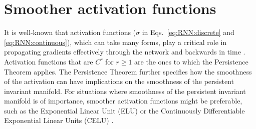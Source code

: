 \documentclass{article} %
\newcounter{ct}
\theoremstyle{definition}
\theoremstyle{remark}
\begin{document}
\section{Smoother activation functions}
It is well-known that activation functions ($\sigma$ in  Eqs.~\ref{eq:RNN:discrete} and  \ref{eq:RNN:continuous}), which can take many forms, play a critical role in propagating gradients effectively through the network and backwards in time \citep{jagtap2023,ramachandran2017,hayou2019}.
Activation functions that are $C^r$ for $r\geq 1$ are the ones to which the Persistence Theorem applies. 
The Persistence Theorem further specifies how the smoothness of the activation can have implications on the smoothness of the persistent invariant manifold.
For situations where smoothness of the persistent invariant manifold is of importance, smoother activation functions might be preferable, such as the Exponential Linear Unit (ELU)\citep{clevert2015} or the Continuously Differentiable Exponential Linear Units (CELU) \citep{barron2017}.








\end{document}

